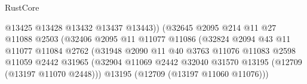 \begin{lexlean}{RustCore}
\begin{coremodule}
                                                  @13425
                                                  @13428
                                                  @13432
                                                  @13437
                                                  @13443))
                                              (@32645
                                                @2095
                                                @214
                                                @11
                                                @27
                                                @11088
                                                @2503
                                                (@32406
                                                  @2095
                                                  @11
                                                  @11077
                                                  @11086
                                                  (@32824
                                                    @2094
                                                    @43
                                                    @11
                                                    @11077
                                                    @11084
                                                    @2762
                                                    (@31948
                                                      @2090
                                                      @11
                                                      @40
                                                      @3763
                                                      @11076
                                                      @11083
                                                      @2598
                                                      @11059
                                                      @2442
                                                      @31965
                                                      (@32904
                                                        @11069
                                                        @2442
                                                        @32040
                                                        @31570
                                                        @13195
                                                        (@12709 (@13197 @11070 @2448)))
                                                      @13195
                                                      (@12709 (@13197 @11060 @11076)))

\end{coremodule}
\end{lexlean}
